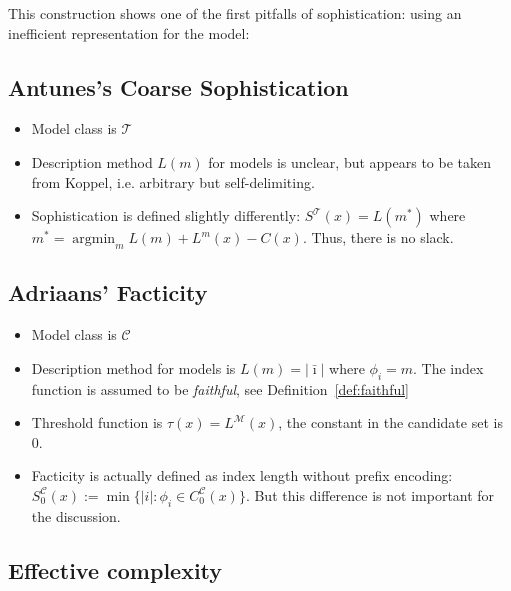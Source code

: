 \documentclass{style/llncs}
\newcommand{\M}{\mathscr M}
\newcommand{\C}{\mathscr C}
\newcommand{\T}{\mathscr T}
\newcommand{\argmin}{\mathop{\arg\min}}
\begin{document}
This construction shows one of the first pitfalls of sophistication: using an inefficient representation for the model:


\subsection{Antunes's Coarse Sophistication}

\begin{itemize}
\item Model class is $\T$
\item Description method $L(m)$ for models is unclear, but appears to be
  taken from Koppel, i.e. arbitrary but self-delimiting.
\item Sophistication is defined slightly differently: $S^\T(x)=L(m^*)$ where $m^*=\argmin_m L(m)+L^m(x)-C(x)$. Thus, there is no slack.
\end{itemize}


\subsection{Adriaans' Facticity}

\begin{itemize}
\item Model class is $\C$
\item Description method for models is $L(m)=|\bar\imath|$ where
  $\phi_i=m$. The index function is assumed to be \emph{faithful}, see
  Definition~\ref{def:faithful}
\item Threshold function is $\tau(x)=L^\M(x)$, the constant in the candidate set is $0$.
\item Facticity is actually defined as index length without prefix
  encoding:  $S^\C_0(x):=\min\{|i|:\phi_i\in C^\C_0(x)\}$. But this
  difference is not important for the discussion.
\end{itemize}




\subsection{Effective complexity}
\end{document}
